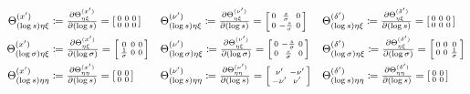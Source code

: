 \documentclass{article}
\begin{document}
\begin{align}
  \Theta_{(\log s)\eta\xi}^{(x')}       & \coloneqq \tfrac{\partial \Theta_{\eta\xi}^{(x')}}{\partial (\log s)} = \begin{bsmallmatrix} 0 & 0 & 0 \\ 0 & 0 & 0 \end{bsmallmatrix}       &  & \Theta_{(\log s)\eta\xi}^{(\nu')} \coloneqq \tfrac{\partial \Theta_{\eta\xi}^{(\nu')}}{\partial (\log s)} = \begin{bsmallmatrix} 0 & \frac{s}{\sigma} & 0 \\ 0 & -\frac{s}{\sigma} & 0 \end{bsmallmatrix}             &  & \Theta_{(\log s)\eta\xi}^{(\delta')} \coloneqq \tfrac{\partial \Theta_{\eta\xi}^{(\delta')}}{\partial (\log s)} = \begin{bsmallmatrix} 0 & 0 & 0 \\ 0 & 0 & 0 \end{bsmallmatrix}              \\
  \Theta_{(\log \sigma)\eta\xi}^{(x')}  & \coloneqq \tfrac{\partial \Theta_{\eta\xi}^{(x')}}{\partial (\log \sigma)} = \begin{bsmallmatrix} 0 & 0 & 0 \\ \frac{1}{\sigma} & 0 & 0 \end{bsmallmatrix}  &  & \Theta_{(\log \sigma)\eta\xi}^{(\nu')} \coloneqq \tfrac{\partial \Theta_{\eta\xi}^{(\nu')}}{\partial (\log \sigma)} = \begin{bsmallmatrix} 0 & -\frac{s}{\sigma} & 0 \\ 0 & \frac{s}{\sigma} & 0 \end{bsmallmatrix}   &  & \Theta_{(\log \sigma)\eta\xi}^{(\delta')} \coloneqq \tfrac{\partial \Theta_{\eta\xi}^{(\delta')}}{\partial (\log \sigma)} = \begin{bsmallmatrix} 0 & 0 & 0 \\ 0 & 0 & \frac{1}{\sigma} \end{bsmallmatrix}    \\
  \Theta_{(\log s)\eta\eta}^{(x')}      & \coloneqq \tfrac{\partial \Theta_{\eta\eta}^{(x')}}{\partial (\log s)} = \begin{bsmallmatrix} 0 & 0 \\ 0 & 0 \end{bsmallmatrix}      &  & \Theta_{(\log s)\eta\eta}^{(\nu')} \coloneqq \tfrac{\partial \Theta_{\eta\eta}^{(\nu')}}{\partial (\log s)} = \begin{bsmallmatrix} \nu' & -\nu' \\ -\nu' & \nu' \end{bsmallmatrix}           &  & \Theta_{(\log s)\eta\eta}^{(\delta')} \coloneqq \tfrac{\partial \Theta_{\eta\eta}^{(\delta')}}{\partial (\log s)} = \begin{bsmallmatrix} 0 & 0 \\ 0 & 0 \end{bsmallmatrix}            \\

\end{align}
\end{document}

